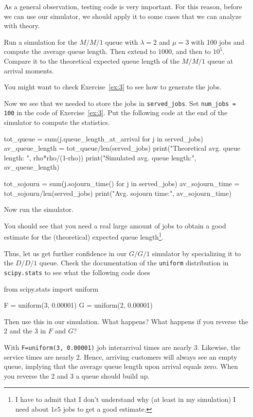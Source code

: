 \documentclass{scrartcl}
\begin{document}
As a general observation, testing code is very important. For this reason, before we can use our simulator, we should apply it to some cases that we can analyze with theory. 

\begin{exercise}
  Run a simulation for the $M/M/1$ queue with $\lambda=2$ and $\mu=3$ with 100 jobs and compute the average queue length. Then extend to $1000$, and then to $10^5$. Compare it to the theoretical expected queue length of the $M/M/1$ queue at arrival moments.

  \hintsymbol\begin{hint}
You might want to check Exercise~\ref{ex:3} to see how to generate the jobs.
    \end{hint}
  \begin{solution}
Now we see that we needed to store the jobs in \texttt{served\_jobs}. Set \texttt{num\_jobs = 100} in the code of Exercise~\ref{ex:3}. Put the following code at the end of the simulator to compute the statistics. 
    \begin{pyblock}

tot_queue = sum(j.queue_length_at_arrival for j in served_jobs)
av_queue_length = tot_queue/len(served_jobs)
print("Theoretical avg. queue length: ", rho*rho/(1-rho))
print("Simulated avg. queue length:", av_queue_length)
      
tot_sojourn = sum(j.sojourn_time() for j in served_jobs)
av_sojourn_time = tot_sojourn/len(served_jobs)
print("Avg. sojourn time:", av_sojourn_time)
\end{pyblock}

Now run the simulator.

You should see that you need a real large amount of jobs to obtain a good estimate for the (theoretical) expected queue length\footnote{I have to admit that I don't understand why (at least in my simulation) I need about $1e5$ jobs to get a good estimate.}. 

  \end{solution}
\end{exercise}

\begin{exercise}
 Thus, let us get further confidence in our $G/G/1$ simulator by specializing it to the $D/D/1$ queue. Check the documentation of the \texttt{uniform} distribution in \texttt{scipy.stats} to see what the following code does
  \begin{pyblock}
from scipy.stats import uniform

F = uniform(3, 0.00001)
G = uniform(2, 0.00001)
\end{pyblock}

Then use this in our simulation. What happens? What happens if you reverse the 2 and the 3 in $F$ and $G$?
\begin{solution}
  With \texttt{F=uniform(3, 0.00001)} job interarrival times are nearly 3. Likewise, the service times are nearly 2. Hence, arriving customers will always see an empty queue, implying that the average queue length upon arrival equals zero. When you reverse the 2 and 3 a queue should build up. 
\end{solution}
\end{exercise}
\end{document}
